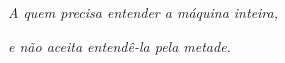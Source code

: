 %
%
\newpage
\thispagestyle{empty}
\vspace*{\fill}
\begin{flushright}
	\textit{A quem precisa entender a máquina inteira,}

	\textit{e não aceita entendê-la pela metade.}
\end{flushright}
\vspace*{\fill}

